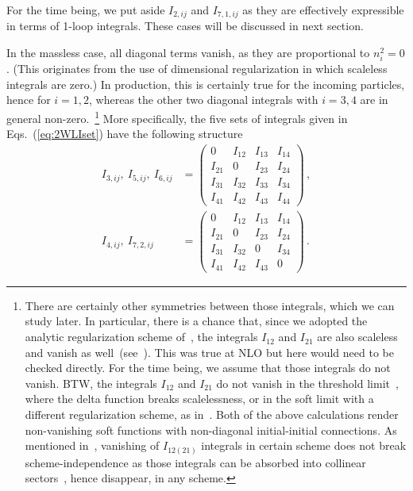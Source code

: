 \documentclass[a4paper,11pt]{report}
\numberwithin{equation}{section}
\begin{document}
For the time being, we put aside $I_{2, ij}$ and 
$I_{7,1, ij}$ as they are effectively expressible in terms of 1-loop integrals.
These cases will be discussed in next section.

In the massless case, all diagonal terms vanish, as they are proportional to
$n_i^2 = 0$. (This originates from the use of dimensional regularization in
which scaleless integrals are zero.) In \ttbar production, this is certainly true
for the incoming particles, hence for $i=1,2$, whereas the other two diagonal
integrals with $i=3,4$ are in general non-zero.~\footnote{
There are certainly other symmetries between those integrals, which we can
study later.
%
In particular, there is a chance that, since we adopted the analytic regularization scheme
of~\cite{Li:2013mia}, the integrals $I_{12}$ and $I_{21}$ are also
scaleless and vanish as well~(see~\cite{Becher:2010tm}). 
%
This was true at NLO but here would need to be checked directly. For the time
being, we assume that those integrals do not vanish.
%
BTW, the integrals $I_{12}$ and $I_{21}$
do not vanish in the threshold limit~\cite{Ahrens:2010zv}, where the delta
function breaks scalelessness, or in the soft limit with a different
regularization scheme, as
in~\cite{Chiu:2012ir}. Both of the above calculations render non-vanishing
soft functions with non-diagonal initial-initial connections. 
%
As mentioned in~\cite{Li:2013mia}, vanishing of  $I_{12 (21)}$ integrals in
certain scheme does not break scheme-independence as those integrals can be
absorbed into collinear sectors~\cite{Li:2013mia}, hence disappear, in any
scheme.
}
%
More specifically, the five sets of integrals given in Eqs.~(\ref{eq:2WLIset})
have the following structure
%
\begin{subequations}
  \begin{align}
    I_{3, ij},\ I_{5, ij},\ I_{6, ij} &= 
    \left(
    \begin{array}{cccc}
    0      & I_{12} & I_{13} & I_{14} \\
    I_{21} & 0      & I_{23} & I_{24} \\
    I_{31} & I_{32} & I_{33} & I_{34} \\
    I_{41} & I_{42} & I_{43} & I_{44} 
    \end{array}
    \right)\,,
    \\[0.7em]
    I_{4, ij},\ I_{7,2, ij} &= 
    \left(
    \begin{array}{cccc}
    0      & I_{12} & I_{13} & I_{14} \\
    I_{21} & 0      & I_{23} & I_{24} \\
    I_{31} & I_{32} & 0      & I_{34} \\
    I_{41} & I_{42} & I_{43} & 0 
    \end{array}
    \right)\,.
  \end{align}
\end{subequations}
 
\end{document}
